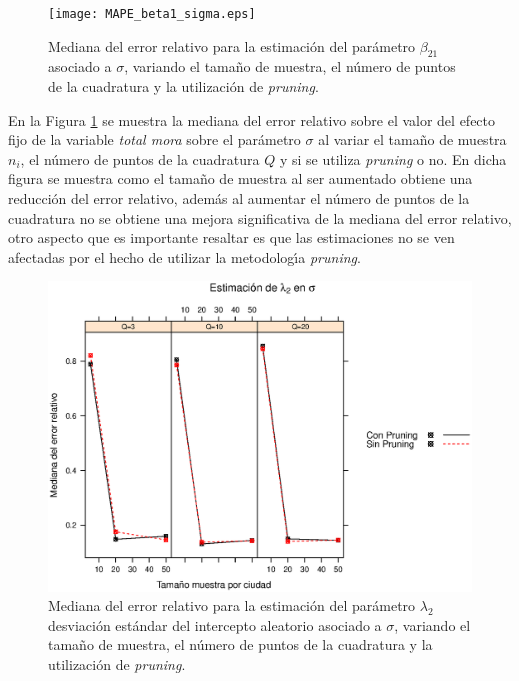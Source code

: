 \begin{figure}
	\begin{center}
		\texttt{[image: MAPE\_beta1\_sigma.eps]}	
		\caption{Mediana del error relativo para la estimaci\'{o}n del par\'{a}metro $\beta_{21}$ asociado a $\sigma$, variando el tama\~{n}o de muestra, el n\'{u}mero de puntos de la cuadratura y  la utilizaci\'{o}n de \textit{pruning}.}
		\label{MAPE_beta1_sigma}
	\end{center}
\end{figure}

En la Figura \ref{MAPE_beta1_sigma} se muestra la mediana del error relativo sobre el valor del efecto fijo de la variable \textsl{total mora} sobre el par\'{a}metro $\sigma$ al variar el tama\~{n}o de muestra $n_i$, el n\'{u}mero de puntos de la cuadratura $Q$ y si se utiliza \textit{pruning} o no. En dicha figura se muestra como el tama\~{n}o de muestra al ser aumentado obtiene una reducci\'{o}n del error relativo, adem\'{a}s al aumentar el n\'{u}mero de puntos de la cuadratura no se obtiene una mejora significativa de la mediana del error relativo, otro aspecto que es importante resaltar es que las estimaciones no se ven afectadas por el hecho de utilizar la metodolog\'{\i}a \textit{pruning}.\\


\begin{figure}
	\begin{center}
		\includegraphics[scale=0.6]{MAPE_lambda2_sigma.eps}	
		\caption{Mediana del error relativo para la estimaci\'{o}n del par\'{a}metro $\lambda_2$ desviaci\'{o}n est\'{a}ndar del intercepto aleatorio asociado a $\sigma$, variando el tama\~{n}o de muestra, el n\'{u}mero de puntos de la cuadratura y la utilizaci\'{o}n de \textit{pruning}.}
		\label{MAPE_lambda2_sigma}
	\end{center}
\end{figure}

